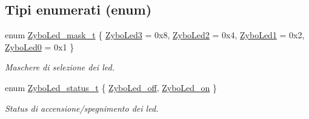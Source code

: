\subsection*{Tipi enumerati (enum)}
\begin{DoxyCompactItemize}
\item 
enum \hyperlink{group___led_gad11701cccac394f7e1f90de8f85695f3}{Zybo\+Led\+\_\+mask\+\_\+t} \{ \hyperlink{group___led_ggad11701cccac394f7e1f90de8f85695f3adc5edc2adfd899da9f149cb61364b141}{Zybo\+Led3} = 0x8, 
\hyperlink{group___led_ggad11701cccac394f7e1f90de8f85695f3a4fa521f6fce7c4ba77d1d8144e71cdfc}{Zybo\+Led2} = 0x4, 
\hyperlink{group___led_ggad11701cccac394f7e1f90de8f85695f3ad71c06f65dfffcf825d48f287718d9be}{Zybo\+Led1} = 0x2, 
\hyperlink{group___led_ggad11701cccac394f7e1f90de8f85695f3ae1a1e8fa0bf803793ff27004884b85fe}{Zybo\+Led0} = 0x1
 \}
\begin{DoxyCompactList}\small\item\em Maschere di selezione dei led. \end{DoxyCompactList}\item 
enum \hyperlink{group___led_ga3dcb274f22e577705c49944b8d1f4b12}{Zybo\+Led\+\_\+status\+\_\+t} \{ \hyperlink{group___led_gga3dcb274f22e577705c49944b8d1f4b12a9679f1c302afdb51915a2331b4ec92f3}{Zybo\+Led\+\_\+off}, 
\hyperlink{group___led_gga3dcb274f22e577705c49944b8d1f4b12aafcf0ae16a6edec807c06bb0a99f7e8b}{Zybo\+Led\+\_\+on}
 \}
\begin{DoxyCompactList}\small\item\em Status di accensione/spegnimento dei led. \end{DoxyCompactList}\end{DoxyCompactItemize}
